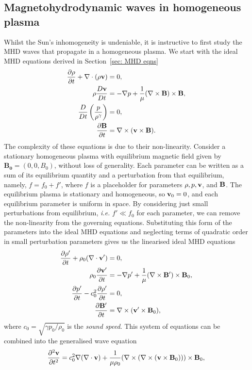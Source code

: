 \documentclass[12pt]{../style-files/ociamthesis}
\begin{document}
\subsection{Magnetohydrodynamic waves in homogeneous plasma}
Whilst the Sun's inhomogeneity is undeniable, it is instructive to first study the MHD waves that propagate in a homogeneous plasma. We start with the ideal MHD equations derived in Section~\ref{sec: MHD eqns}
\begin{align}
	\frac{\partial\rho}{\partial t} + \nabla\cdot(\rho \mathbf{v}) &= 0, \\
	\rho\frac{D\mathbf{v}}{Dt} &= -\nabla p + \frac{1}{\mu}(\nabla\times\mathbf{B})\times\mathbf{B}, \\
	\frac{D}{Dt}\left(\frac{p}{\rho^\gamma}\right) &= 0, \\
	\frac{\partial\mathbf{B}}{\partial t} &= \nabla\times(\mathbf{v}\times\mathbf{B}).
\end{align}
The complexity of these equations is due to their non-linearity. Consider a stationary homogeneous plasma with equilibrium magnetic field given by $\mathbf{B_0} = (0, 0, B_0)$, without loss of generality. Each parameter can be written as a sum of its equilibrium quantity and a perturbation from that equilibrium, namely, $f = f_0 + f'$, where $f$ is a placeholder for parameters $\rho, p, \mathbf{v}$, and $\mathbf{B}$. The equilibrium plasma is stationary and homogeneous, so $\mathbf{v}_0 = 0$, and each equilibrium parameter is uniform in space. By considering just small perturbations from equilibrium, \textit{i.e.} $f' \ll f_0$ for each parameter, we can remove the non-linearity from the governing equations. Substituting this form of the parameters into the ideal MHD equations and neglecting terms of quadratic order in small perturbation parameters gives us the linearised ideal MHD equations
\begin{align}
	\frac{\partial\rho'}{\partial t} + \rho_0(\nabla\cdot\mathbf{v}') &= 0, \label{cont eqn lin} \\
	\rho_0\frac{\partial\mathbf{v}'}{\partial t} &= -\nabla p' + \frac{1}{\mu}(\nabla\times\mathbf{B}')\times\mathbf{B}_0, \label{mom eqn lin} \\
	\frac{\partial p'}{\partial t} - c_0^2\frac{\partial\rho'}{\partial t} &= 0, \label{energy eqn lin} \\
	\frac{\partial\mathbf{B}'}{\partial t} &= \nabla\times(\mathbf{v}'\times\mathbf{B}_0), \label{ind eqn lin}
\end{align}
where $c_0 = \sqrt{\gamma p_0/\rho_0}$ is the \textit{sound speed}. This system of equations can be combined into the generalised wave equation
\begin{equation}
	\frac{\partial^2\mathbf{v}}{\partial t^2} = c_0^2\nabla(\nabla\cdot\mathbf{v}) + \frac{1}{\mu\rho_0}(\nabla\times(\nabla\times(\mathbf{v}\times\mathbf{B}_0)))\times\mathbf{B}_0, \label{homogeneous wave eqn}
\end{equation}
\end{document}
